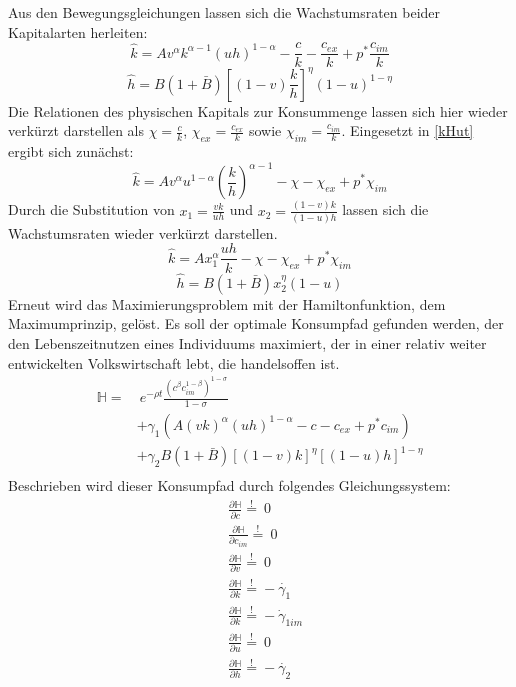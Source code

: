 %
Aus den Bewegungsgleichungen lassen sich die Wachstumsraten beider Kapitalarten herleiten: 
%
\begin{equation}
	\hat{k}=Av^\alpha k^{\alpha-1}(uh)^{1-\alpha}-\frac{c}{k}-\frac{c_{ex}}{k}+p^*\frac{c_{im}}{k}\label{kHut}
\end{equation}
%
\begin{equation}
	\hat{h}=B(1+\bar{B})\left[(1-v)\frac{k}{h}\right]^{\eta}(1-u)^{1-\eta}
\end{equation}
%
Die Relationen des physischen Kapitals zur Konsummenge lassen sich hier wieder verkürzt darstellen als $\chi=\frac{c}{k}$, $\chi_{ex}=\frac{c_{ex}}{k}$ sowie $\chi_{im}=\frac{c_{im}}{k}$. Eingesetzt in \eqref{kHut} ergibt sich zunächst:
%
\begin{equation}
	\hat{k}=Av^\alpha u^{1-\alpha}\left(\frac{k}{h}\right)^{\alpha-1}-\chi-\chi_{ex}+p^*\chi_{im}
\end{equation}
%
Durch die Substitution von $x_1=\frac{vk}{uh}$ und $x_2=\frac{(1-v)k}{(1-u)h}$ lassen sich die Wachstumsraten wieder verkürzt darstellen.\\
%
\begin{equation}
	\boxed{\hat{k}=Ax_1^\alpha \frac{uh}{k}-\chi-\chi_{ex}+p^*\chi_{im}}
\end{equation}
%
\begin{equation}
	\boxed{\hat{h}=B(1+\bar{B})x_2^\eta(1-u)}
\end{equation}
%
Erneut wird das Maximierungsproblem mit der Hamiltonfunktion, dem Maximumprinzip, gelöst. Es soll der optimale Konsumpfad gefunden werden, der den Lebenszeitnutzen eines Individuums maximiert, der in einer relativ weiter entwickelten Volkswirtschaft lebt, die handelsoffen ist.
%
\begin{equation}
	\begin{split}
		\mathbb{H}=&~e^{-\rho t}\frac{(c^\beta c_{im}^{1-\beta})^{1-\sigma}}{1-\sigma}\\
		&+\gamma_1(A(vk)^\alpha(uh)^{1-\alpha}-c-c_{ex}+p^*c_{im})\\
		&+\gamma_2B(1+\bar{B})[(1-v)k]^{\eta}[(1-u)h]^{1-\eta}\\
	\end{split}
\end{equation}
%
Beschrieben wird dieser Konsumpfad durch folgendes Gleichungssystem: 
%
\begin{align}
	&\frac{\partial\mathbb{H}}{\partial c}\overset{!}{=}~0\label{eq:lfoc1IL}\\
	&\frac{\partial\mathbb{H}}{\partial c_{im}}\overset{!}{=}~0\label{eq:lfoc1imIL}\\
	&\frac{\partial\mathbb{H}}{\partial v}\overset{!}{=}~0\label{eq:lfoc2IL}\\
	&\frac{\partial\mathbb{H}}{\partial k}\overset{!}{=}-\dot{\gamma_1}\label{eq:lfoc3IL}\\
	&\frac{\partial\mathbb{H}}{\partial k}\overset{!}{=}-\dot{\gamma}_{1im}\label{eq:lfoc3imIL}\\
	&\frac{\partial\mathbb{H}}{\partial u}\overset{!}{=}~0\label{eq:lfoc4IL}\\
	&\frac{\partial\mathbb{H}}{\partial h}\overset{!}{=}-\dot{\gamma_2}\label{eq:lfoc5IL}
\end{align}
